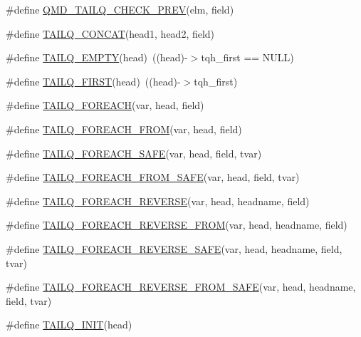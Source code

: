 \begin{DoxyCompactItemize}
\item 
\#define \hyperlink{queue_8h_a00699c4f3c7eb447c5ea7efc17999d09}{Q\-M\-D\-\_\-\-T\-A\-I\-L\-Q\-\_\-\-C\-H\-E\-C\-K\-\_\-\-P\-R\-E\-V}(elm, field)
\item 
\#define \hyperlink{queue_8h_afe4852d23c85543fafc53ad409461750}{T\-A\-I\-L\-Q\-\_\-\-C\-O\-N\-C\-A\-T}(head1, head2, field)
\item 
\#define \hyperlink{queue_8h_ac3c9da7ac712eacbbad5cc54d7a3477e}{T\-A\-I\-L\-Q\-\_\-\-E\-M\-P\-T\-Y}(head)~((head)-\/$>$tqh\-\_\-first == N\-U\-L\-L)
\item 
\#define \hyperlink{queue_8h_a7d6894360bd1c41e0e6f6d84998c1362}{T\-A\-I\-L\-Q\-\_\-\-F\-I\-R\-S\-T}(head)~((head)-\/$>$tqh\-\_\-first)
\item 
\#define \hyperlink{queue_8h_a16e5fc168e7f3494d4b1df54447d871e}{T\-A\-I\-L\-Q\-\_\-\-F\-O\-R\-E\-A\-C\-H}(var, head, field)
\item 
\#define \hyperlink{queue_8h_a749ad60232f2de8931c9c0871987f84f}{T\-A\-I\-L\-Q\-\_\-\-F\-O\-R\-E\-A\-C\-H\-\_\-\-F\-R\-O\-M}(var, head, field)
\item 
\#define \hyperlink{queue_8h_a2a85f19896399eecd0ebf91cb8176166}{T\-A\-I\-L\-Q\-\_\-\-F\-O\-R\-E\-A\-C\-H\-\_\-\-S\-A\-F\-E}(var, head, field, tvar)
\item 
\#define \hyperlink{queue_8h_aa9cc420c740f2f56c6efdacea6cc4d94}{T\-A\-I\-L\-Q\-\_\-\-F\-O\-R\-E\-A\-C\-H\-\_\-\-F\-R\-O\-M\-\_\-\-S\-A\-F\-E}(var, head, field, tvar)
\item 
\#define \hyperlink{queue_8h_aa7f65c910cd4616fcfa9723c5763b1a5}{T\-A\-I\-L\-Q\-\_\-\-F\-O\-R\-E\-A\-C\-H\-\_\-\-R\-E\-V\-E\-R\-S\-E}(var, head, headname, field)
\item 
\#define \hyperlink{queue_8h_a6cb12f27e7182bcb25c7dfdc9a8e83bf}{T\-A\-I\-L\-Q\-\_\-\-F\-O\-R\-E\-A\-C\-H\-\_\-\-R\-E\-V\-E\-R\-S\-E\-\_\-\-F\-R\-O\-M}(var, head, headname, field)
\item 
\#define \hyperlink{queue_8h_aa7841e4f848e470b9f2bc676473d7a5b}{T\-A\-I\-L\-Q\-\_\-\-F\-O\-R\-E\-A\-C\-H\-\_\-\-R\-E\-V\-E\-R\-S\-E\-\_\-\-S\-A\-F\-E}(var, head, headname, field, tvar)
\item 
\#define \hyperlink{queue_8h_a5a73496c2e5232e55ad90245bf301de8}{T\-A\-I\-L\-Q\-\_\-\-F\-O\-R\-E\-A\-C\-H\-\_\-\-R\-E\-V\-E\-R\-S\-E\-\_\-\-F\-R\-O\-M\-\_\-\-S\-A\-F\-E}(var, head, headname, field, tvar)
\item 
\#define \hyperlink{queue_8h_a449d224023780e46253b83b61e0a50a9}{T\-A\-I\-L\-Q\-\_\-\-I\-N\-I\-T}(head)
\item 

\end{DoxyCompactItemize}
